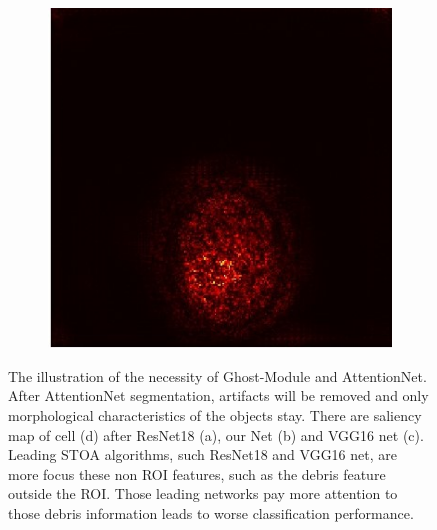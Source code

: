 \begin{figure}[h]
\begin{center}
\begin{subfigure}[b]{0.25\textwidth}
		    \centering
			\includegraphics[height= 0.15\textheight]{thesis-template-master/images/hd1 (4550)vggnetWithcellyolo.jpg}
			\caption{}
			\label{fig:cellnet}
		\end{subfigure}
	\end{center}
	\caption{The illustration of the necessity of Ghost-Module and AttentionNet. After AttentionNet segmentation, artifacts will be removed and only morphological characteristics of the objects stay. There are saliency map of cell (d) after ResNet18\cite{20} (a), our Net (b) and VGG16 net \cite{23} (c). Leading  STOA  algorithms, such ResNet18 and VGG16 net, are  more focus  these  non  ROI  features,  such  as  the  debris  feature  outside the ROI. Those leading networks pay more attention to those debris information leads to worse classification performance.}
\end{figure}

